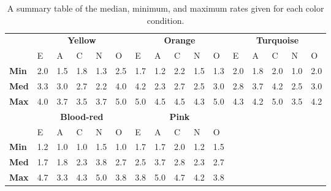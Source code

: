 \begin{table}[hbt!]
    \renewcommand{\arraystretch}{1}
    \begin{center}
        \begin{tabular}{p{}|
        p{}|p{}|p{}|p{}|p{}||
        p{}|p{}|p{}|p{}|p{}||
        p{}|p{}|p{}|p{}|p{}|}
            \cline{2-16}
            & \multicolumn{5}{c||}{\textbf{Yellow}} & \multicolumn{5}{c||}{\textbf{Orange}}
            & \multicolumn{5}{c|}{\textbf{Turquoise}} \\
            \cline{2-16}
            & E & A & C & N & O & E & A & C & N & O & E & A & C & N & O      \\
            \cline{2-16}
            \textbf{Min}    & 2.0 & 1.5 & 1.8 & 1.3 & 2.5 & 1.7 & 1.2 & 2.2 & 1.5 & 1.3 & 2.0 & 1.8 & 2.0 & 1.0 & 2.0  \\
            \textbf{Med}    & 3.3 & 3.0 & 2.7 & 2.2 & 4.0 & 4.2 & 2.3 & 2.7 & 2.5 & 3.0 & 2.8 & 3.7 & 4.2 & 2.5 & 3.0  \\
            \textbf{Max}    & 4.0 & 3.7 & 3.5 & 3.7 & 5.0 & 5.0 & 4.5 & 4.5 & 4.3 & 5.0 & 4.3 & 4.2 & 5.0 & 3.5 & 4.2 \\
            \cline{2-16}
            \cline{2-11}
            &  \multicolumn{5}{|c||}{\textbf{Blood-red}} & \multicolumn{5}{|c||}{\textbf{Pink}} \\
            \cline{2-11}
            & E & A & C & N & O & E & A & C & N & O            \\
            \cline{2-11}
            \textbf{Min}    & 1.2 & 1.0 & 1.0 & 1.5 & 1.0 & 1.7 & 1.7 & 2.0 & 1.2 & 1.5    \\
            \textbf{Med}    & 1.7 & 1.8 & 2.3 & 3.8 & 2.7 & 2.5 & 3.7 & 2.8 & 2.3 & 2.7    \\
            \textbf{Max}    & 4.7 & 3.3 & 4.3 & 5.0 & 3.8 & 3.8 & 5.0 & 4.7 & 4.2 & 3.8    \\
            \cline{2-11}
        \end{tabular}
        \caption[]{A summary table of the median, minimum, and maximum rates given for each color condition.\footnotemark}
        \label{table:medianMT2}
    \end{center}
\end{table}


